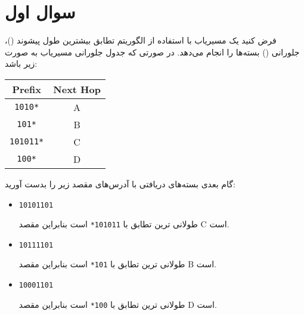 \section{سوال اول}

فرض کنید یک مسیریاب با استفاده از الگوریتم تطابق بیشترین طول پیشوند ()، جلو‌رانی () بسته‌ها را انجام می‌دهد. در صورتی که جدول جلورانی مسیریاب به صورت زیر باشد:


\begin{latin}
	\begin{center}
		\begin{tabular}{|c|c|}
			\hline
			\textbf{Prefix} & \textbf{Next Hop} \\
			\hline\hline
			\texttt{1010*} & A \\
			\hline
			\texttt{101*} & B \\
			\hline
			\texttt{101011*} & C \\
			\hline
			\texttt{100*} & D \\
			\hline
		\end{tabular}
	\end{center}
\end{latin}



گام بعدی بسته‌های دریافتی با آدرس‌های مقصد زیر را بدست آورید:

\begin{itemize}
	\item \texttt{10101101}
	\begin{qsolve}
		طولانی ترین تطابق با \texttt{101011*} است بنابراین مقصد C است.
	\end{qsolve}
	
	\item \texttt{10111101}
	\begin{qsolve}
		طولانی ترین تطابق با \texttt{101*} است بنابراین مقصد B است.
	\end{qsolve}
	
	\item \texttt{10001101}
	\begin{qsolve}
		طولانی ترین تطابق با \texttt{100*} است بنابراین مقصد D است.
	\end{qsolve}
\end{itemize}


